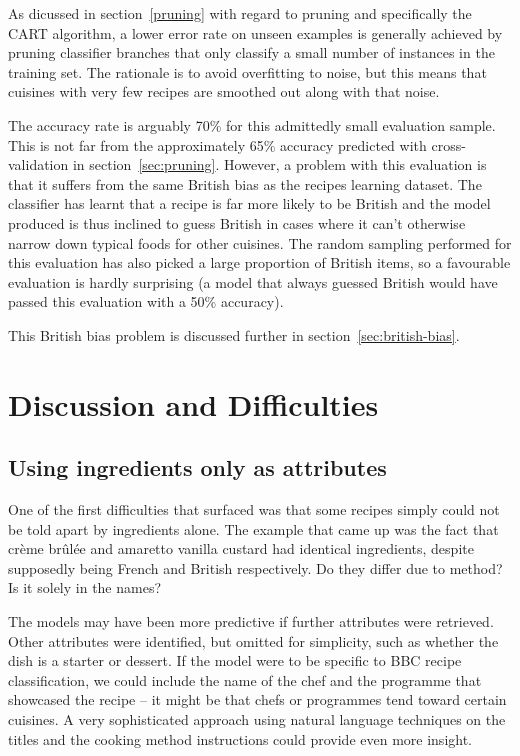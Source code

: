 \documentclass[11pt,a4paper]{article}
\begin{document}
As dicussed in section~\ref{pruning} with regard to pruning and specifically the CART
algorithm, a lower error rate on unseen examples is generally achieved by pruning
classifier branches that only classify a small number of instances in the training set.
The rationale is to avoid overfitting to noise, but this means that cuisines with
very few recipes are smoothed out along with that noise.

The accuracy rate is arguably 70\% for this admittedly small evaluation sample. This
is not far from the approximately 65\% accuracy predicted with cross-validation in
section~\ref{sec:pruning}. However, a problem with this evaluation is that
it suffers from the same British bias as the
recipes learning dataset. The classifier has learnt that a recipe is far more
likely to be British and the model produced is thus inclined to guess British
in cases where it can't otherwise narrow down typical foods for other cuisines. The
random sampling performed for this evaluation has also picked a large proportion
of British items, so a favourable evaluation is hardly surprising (a model that
always guessed British would have passed this evaluation with a 50\% accuracy).

This British bias problem is discussed further in section~\ref{sec:british-bias}.

\section{Discussion and Difficulties}
\subsection{Using ingredients only as attributes}

One of the first difficulties that surfaced was that some recipes simply could not
be told apart by ingredients alone. The example that came up was the fact that
cr\`eme br\^ul\'ee and amaretto vanilla custard had identical ingredients, despite
supposedly being French and British respectively. Do they differ due to method? Is
it solely in the names?

The models may have been more predictive if further attributes were retrieved.
Other attributes were identified, but omitted for simplicity, such as whether
the dish is a starter or dessert. If the model were to be specific to BBC recipe
classification, we could include the name of the chef and the programme
that showcased the recipe -- it might be that chefs or programmes tend toward
certain cuisines. A very sophisticated approach using natural language techniques
on the titles and the cooking method instructions could provide even more
insight.
\end{document}
